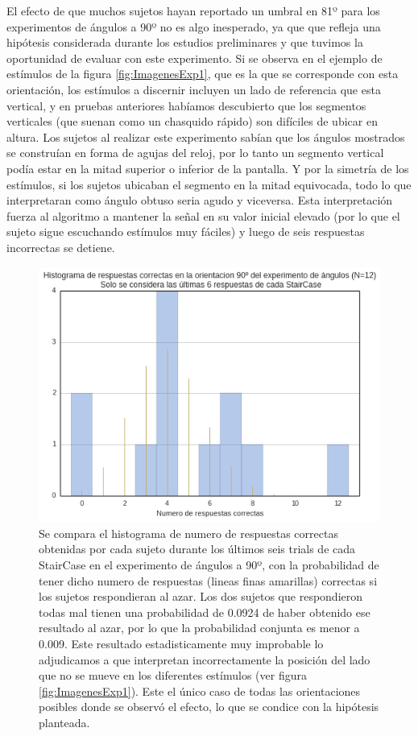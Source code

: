 \documentclass{article}
\begin{document}
    El efecto de que muchos sujetos hayan reportado un umbral en 81º para los experimentos de ángulos a 90º no es algo inesperado, ya que que refleja una hipótesis considerada durante los estudios preliminares y que tuvimos la oportunidad de evaluar con este experimento. Si se observa en el ejemplo de estímulos de la figura \ref{fig:ImagenesExp1}, que es la que se corresponde con esta orientación, los estímulos a discernir incluyen un lado de referencia que esta vertical, y en pruebas anteriores habíamos descubierto que los segmentos verticales (que suenan como un chasquido rápido) son difíciles de ubicar en altura. Los sujetos al realizar este experimento sabían que los ángulos mostrados se construían en forma de agujas del reloj, por lo tanto un segmento vertical podía estar en la mitad superior o inferior de la pantalla. Y por la simetría de los estímulos, si los sujetos ubicaban el segmento en la mitad equivocada, todo lo que interpretaran como ángulo obtuso seria agudo y viceversa. Esta interpretación fuerza al algoritmo a mantener la señal en su valor inicial elevado (por lo que el sujeto sigue escuchando estímulos muy fáciles) y luego de seis respuestas incorrectas se detiene. 
    
    \begin{figure}
        \center
        \includegraphics[width=\textwidth]{Imagenes/Exp1_Saturacion.png}
        \caption{Se compara el histograma de numero de respuestas correctas obtenidas por cada sujeto durante los últimos seis trials de cada StairCase en el experimento de ángulos a 90º, con la probabilidad de tener dicho numero de respuestas (lineas finas amarillas) correctas si los sujetos respondieran al azar. Los dos sujetos que respondieron todas mal tienen una probabilidad de 0.0924 de haber obtenido ese resultado al azar, por lo que la probabilidad conjunta es menor a 0.009. Este resultado estadisticamente muy improbable lo adjudicamos a que interpretan incorrectamente la posición del lado que no se mueve en los diferentes estímulos (ver figura \ref{fig:ImagenesExp1}). Este el único caso de todas las orientaciones posibles donde se observó el efecto, lo que se condice con la hipótesis planteada.}
        \label{fig:Exp1Saturacion}
    \end{figure}  
    
\end{document}
